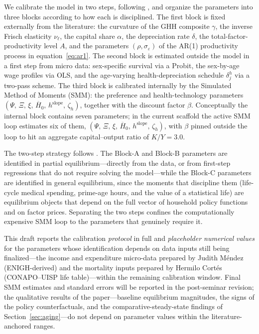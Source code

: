 \documentclass[12pt,a4paper]{article}
\begin{document}
We calibrate the model in two steps, following \citet{gourinchas2002consumption}, and organize the parameters into three blocks according to how each is disciplined. The first block is fixed externally from the literature: the curvature of the GHH composite $\gamma$, the inverse Frisch elasticity $\nu_\ell$, the capital share $\alpha$, the depreciation rate $\delta$, the total-factor-productivity level $A$, and the parameters $(\rho, \sigma_\varepsilon)$ of the AR(1) productivity process in equation~\eqref{eq:ar1}. The second block is estimated outside the model in a first step from micro data: sex-specific survival via a Probit, the sex-by-age wage profiles via OLS, and the age-varying health-depreciation schedule $\delta^h_j$ via a two-pass scheme. The third block is calibrated internally by the Simulated Method of Moments (SMM): the preference and health-technology parameters $(\Psi,\, \Xi,\, \xi,\, \overline{H}_0,\, h^{\mathrm{slope}},\, \zeta_h)$, together with the discount factor $\beta$. Conceptually the internal block contains seven parameters; in the current scaffold the active SMM loop estimates six of them, $(\Psi,\, \Xi,\, \xi,\, \overline{H}_0,\, h^{\mathrm{slope}},\, \zeta_h)$, with $\beta$ pinned outside the loop to hit an aggregate capital--output ratio of $K/Y = 3.0$.

The two-step strategy follows \citet{gourinchas2002consumption}. The Block-A and Block-B parameters are identified in partial equilibrium---directly from the data, or from first-step regressions that do not require solving the model---while the Block-C parameters are identified in general equilibrium, since the moments that discipline them (life-cycle medical spending, prime-age hours, and the value of a statistical life) are equilibrium objects that depend on the full vector of household policy functions and on factor prices. Separating the two steps confines the computationally expensive SMM loop to the parameters that genuinely require it.

This draft reports the calibration \emph{protocol} in full and \emph{placeholder numerical values} for the parameters whose identification depends on data inputs still being finalized---the income and expenditure micro-data prepared by Judith M\'endez (ENIGH-derived) and the mortality inputs prepared by Hermilo Cort\'es (CONAPO--UISP life table)---within the remaining calibration window. Final SMM estimates and standard errors will be reported in the post-seminar revision; the qualitative results of the paper---baseline equilibrium magnitudes, the signs of the policy counterfactuals, and the comparative-steady-state findings of Section~\ref{sec:aging}---do not depend on parameter values within the literature-anchored ranges.
\end{document}
